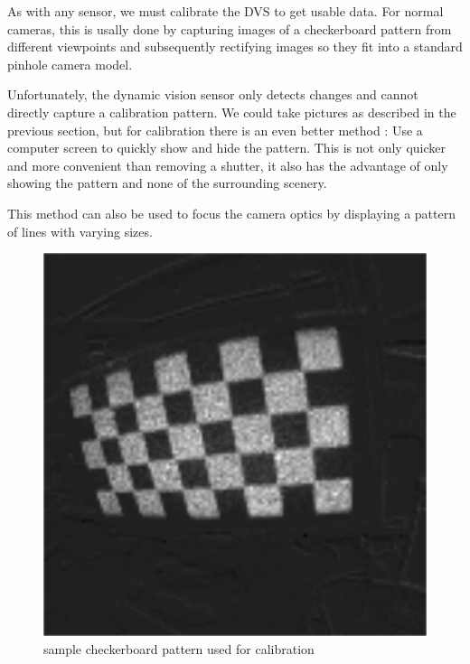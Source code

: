 As with any sensor, we must calibrate the DVS to get usable data. For normal
cameras, this is usally done by capturing images of a checkerboard pattern from
different viewpoints and subsequently rectifying images so they fit into a
standard pinhole camera model.

Unfortunately, the dynamic vision sensor only detects changes and cannot
directly capture a calibration pattern. We could take pictures as described in
the previous section, but for calibration there is an even better method \cite{mueggler2014event}: Use a
computer screen to quickly show and hide the pattern. This is not only quicker
and more convenient than removing a shutter, it also has the advantage of only
showing the pattern and none of the surrounding scenery.

This method can also be used to focus the camera optics by displaying a pattern
of lines with varying sizes.

\begin{figure}
\includegraphics[width=\linewidth]{images/checkerboard_integrated.png}
\caption{sample checkerboard pattern used for calibration}
\label{fig:calibration}
\end{figure}
